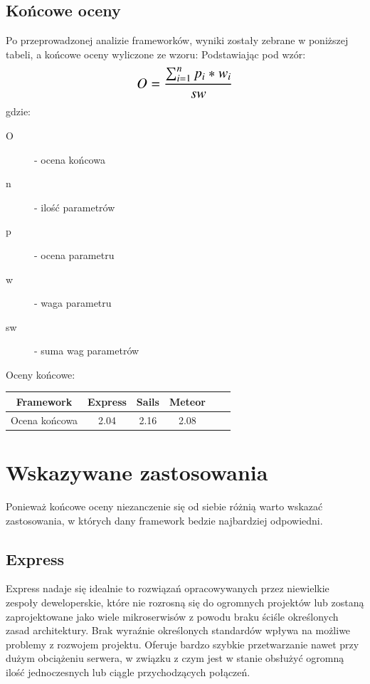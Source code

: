 \documentclass[12pt]{report}
\begin{document}
    \subsection{Końcowe oceny}
      Po przeprowadzonej analizie frameworków, wyniki zostały zebrane w poniższej tabeli, a końcowe oceny wyliczone ze wzoru:
      Podstawiając pod wzór:
      \newline
      \newline
      \[\text{\Large$O = \frac{\sum_{i=1}^{n} p_{i} * w_{i}}{sw}$}\]
      \newline
      gdzie:
      \begin{description}
        \item[O] - ocena końcowa
        \item[n] - ilość parametrów
        \item[p] - ocena parametru
        \item[w] - waga parametru
        \item[sw] - suma wag parametrów
      \end{description}

      Oceny końcowe:
      \newline
      \newline
      \begingroup
        \begin{adjustbox}{center}
          \begin{tabular}{|c|c|c|c|c|p{2.6cm}}
            \hline
            Framework & Express & Sails & Meteor \\
            \hline
            Ocena końcowa & 2.04 & 2.16 & 2.08 \\
            \hline
          \end{tabular}
        \end{adjustbox}
      \endgroup

  \section{Wskazywane zastosowania}
    Ponieważ końcowe oceny niezanczenie się od siebie różnią warto wskazać zastosowania, w których dany framework bedzie najbardziej odpowiedni.
    
    \subsection{Express}
      Express nadaje się idealnie to rozwiązań opracowywanych przez niewielkie zespoły deweloperskie, które nie rozrosną się do ogromnych projektów lub zostaną zaprojektowane jako wiele mikroserwisów z powodu braku ściśle określonych zasad architektury. 
      Brak wyraźnie określonych standardów wpływa na możliwe problemy z rozwojem projektu. 
      Oferuje bardzo szybkie przetwarzanie nawet przy dużym obciążeniu serwera, w związku z czym jest w stanie obsłużyć ogromną ilość jednoczesnych lub ciągle przychodzących połączeń.
\end{document}
